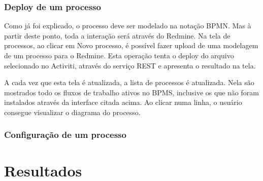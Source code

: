 \subsubsection{Deploy de um processo}\label{sec:integracao_redmine_activiti_inplementacao_funcionalidades_deploy}
Como já foi explicado, o processo deve ser modelado na notação BPMN. Mas à partir deste ponto, toda a interação será através do Redmine.
Na tela de processos, ao clicar em Novo processo, é possível fazer upload de uma modelagem de um processo para o Redmine. Esta operação tenta o deploy do arquivo selecionado no Activiti, através do serviço REST e apresenta o resultado na tela.

A cada vez que esta tela é atualizada, a lista de processos é atualizada. Nela são mostrados todo os fluxos de trabalho ativos no BPMS, inclusive os que não foram instalados através da interface citada acima. Ao clicar numa linha, o usuário consegue visualizar o diagrama do processo.

\subsubsection{Configuração de um processo}\label{sec:integracao_redmine_activiti_inplementacao_funcionalidades_deploy}


\section{Resultados}\label{sec:integracao_redmine_activiti-resultados}